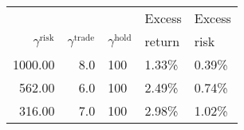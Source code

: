 \documentclass[openany]{now}
\begin{document}
\begin{table}
\begin{center}
\begin{tabular}{rrl|ll}
\toprule
&&&Excess&Excess\\
$\gamma^\mathrm{risk}$ &  $\gamma^\mathrm{trade}$ & $\gamma^\mathrm{hold}$ &  return &    risk \\
\midrule
 1000.00 &                      8.0 &                    100 &   1.33\% &   0.39\% \\
  562.00 &                      6.0 &                    100 &   2.49\% &   0.74\% \\
  316.00 &                      7.0 &                    100 &   2.98\% &   1.02\% \\

\end{tabular}
\end{center}
\end{table}
\end{document}

